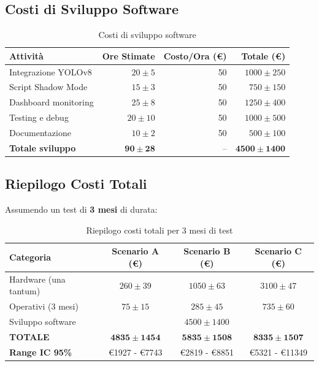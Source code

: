 \documentclass[a4paper,11pt]{article}
\begin{document}
\subsection{Costi di Sviluppo Software}

\begin{table}[H]
    \centering
    \begin{tabular}{lrrr}
        \toprule
        \textbf{Attività} & \textbf{Ore Stimate} & \textbf{Costo/Ora (€)} & \textbf{Totale (€)} \\
        \midrule
        Integrazione YOLOv8 & $20 \pm 5$ & 50 & $1000 \pm 250$ \\
        Script Shadow Mode & $15 \pm 3$ & 50 & $750 \pm 150$ \\
        Dashboard monitoring & $25 \pm 8$ & 50 & $1250 \pm 400$ \\
        Testing e debug & $20 \pm 10$ & 50 & $1000 \pm 500$ \\
        Documentazione & $10 \pm 2$ & 50 & $500 \pm 100$ \\
        \midrule
        \textbf{Totale sviluppo} & $\mathbf{90 \pm 28}$ & -- & $\mathbf{4500 \pm 1400}$ \\
        \bottomrule
    \end{tabular}
    \caption{Costi di sviluppo software}
\end{table}

\subsection{Riepilogo Costi Totali}

Assumendo un test di \textbf{3 mesi} di durata:

\begin{table}[H]
    \centering
    \begin{tabular}{lccc}
        \toprule
        \textbf{Categoria} & \textbf{Scenario A (€)} & \textbf{Scenario B (€)} & \textbf{Scenario C (€)} \\
        \midrule
        Hardware (una tantum) & $260 \pm 39$ & $1050 \pm 63$ & $3100 \pm 47$ \\
        Operativi (3 mesi) & $75 \pm 15$ & $285 \pm 45$ & $735 \pm 60$ \\
        Sviluppo software & \multicolumn{3}{c}{$4500 \pm 1400$} \\
        \midrule
        \textbf{TOTALE} & $\mathbf{4835 \pm 1454}$ & $\mathbf{5835 \pm 1508}$ & $\mathbf{8335 \pm 1507}$ \\
        \midrule
        \textbf{Range IC 95\%} & €1927 - €7743 & €2819 - €8851 & €5321 - €11349 \\
        \bottomrule
    \end{tabular}
    \caption{Riepilogo costi totali per 3 mesi di test}
\end{table}
\end{document}
